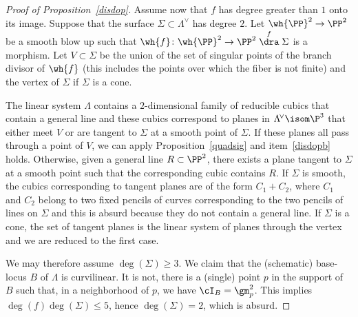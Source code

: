 \begin{proof}[Proof of Proposition~\ref{disdop}]
Assume now that $f$ has degree greater than $1$ onto its image. Suppose that the surface $\Sigma\subset\Lambda^{\!\vee}$ has degree $2$. Let $\wh{\PP}^2\to\PP^2$ be a smooth blow up such that $\wh{f}\colon \wh{\PP}^2\to\PP^2\stackrel{f}\dra \Sigma$ is a morphism.
Let $V\subset\Sigma$ be the union of the set of singular points of the branch divisor of
$\wh{f} $ (this includes the points over which the fiber is not finite) and the vertex of $\Sigma$ if $\Sigma$ is a cone.

The linear system $\Lambda$ contains a $2$-dimensional family of reducible cubics that contain a general line and these cubics correspond to planes in $ \Lambda^{\!\vee}\isom \P^3$ that either meet $V$ or are tangent to $\Sigma$ at a smooth point of $\Sigma$. If these planes all pass through a point of $V$, we can apply Proposition~\ref{quadsig} and item~\eqref{disdopb} holds. Otherwise, given a general line $R\subset\PP^2$, there exists a plane tangent to $\Sigma$ at a smooth point such that the corresponding cubic contains $R$. If $\Sigma$ is smooth, the cubics corresponding to tangent planes are of the form $C_1+C_2$, where $C_1$ and $C_2$ belong to two fixed pencils of curves corresponding to the two pencils of lines on $\Sigma$ and this is absurd because they do not contain a general line. If $\Sigma$ is a cone, the set of tangent planes is the linear system of planes through the vertex and we are reduced to the first case.

We may therefore assume $\deg(\Sigma)\ge 3$. We claim that the (schematic) base-locus $B$ of $\Lambda$ is curvilinear. It is not, there is a (single) point $p$ in the support of ${B}$ such that, in a neighborhood of $p$, we have $\cI_{B}=\gm_p^2$. This implies $\deg( f)\deg(\Sigma)\le 5$, hence $\deg(\Sigma)=2$, which is absurd.


\end{proof}
